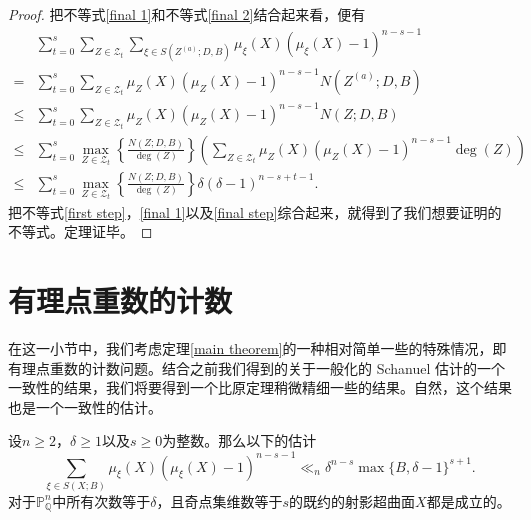 \begin{proof}
把不等式\eqref{final 1}和不等式\eqref{final 2}结合起来看，便有
\begin{align} \label{final step}
& \sum_{t=0}^{s} \sum_{Z\in\mathcal{Z}_t} \sum_{\xi\in S(Z^{(a)};D,B)} \mu_\xi(X)(\mu_\xi(X)-1)^{n-s-1} \nonumber \\
= & \sum_{t=0}^{s} \sum_{Z\in\mathcal{Z}_t} \mu_Z(X)(\mu_Z(X)-1)^{n-s-1}N(Z^{(a)};D,B) \\
\leqslant & \sum_{t=0}^{s} \sum_{Z\in\mathcal{Z}_t} \mu_Z(X)(\mu_Z(X)-1)^{n-s-1}N(Z;D,B) \\
\leqslant & \sum_{t=0}^{s} \max_{Z\in\mathcal{Z}_t} \left\{\frac{N(Z;D,B)}{\deg(Z)}\right\} \left(\sum_{Z\in\mathcal{Z}_t} \mu_Z(X)(\mu_Z(X)-1)^{n-s-1}\deg(Z)\right) \\
\leqslant & \sum_{t=0}^s \max_{Z\in\mathcal{Z}_t} \left\{\frac{N(Z;D,B)}{\deg(Z)}\right\} \delta(\delta-1)^{n-s+t-1}. 
\end{align}
把不等式\eqref{first step}，\eqref{final 1}以及\eqref{final step}综合起来，就得到了我们想要证明的不等式。定理证毕。
\end{proof}

\section{有理点重数的计数}
在这一小节中，我们考虑定理\ref{main theorem}的一种相对简单一些的特殊情况，即有理点重数的计数问题。结合之前我们得到的关于一般化的 Schanuel 估计的一个一致性的结果，我们将要得到一个比原定理稍微精细一些的结果。自然，这个结果也是一个一致性的估计。

\begin{corollary} \label{main corollary}
设$n \geqslant 2$，$\delta \geqslant 1$以及$s \geqslant 0$为整数。那么以下的估计
\begin{equation} \label{estimate in main corollary}
\sum_{\xi\in S(X;B)} \mu_\xi(X)(\mu_\xi(X)-1)^{n-s-1} \ll_{n} \delta^{n-s}\max\{B,\delta-1\}^{s+1}.
\end{equation}
对于$\mathbb{P}^n_{\mathbb{Q}}$中所有次数等于$\delta$，且奇点集维数等于$s$的既约的射影超曲面$X$都是成立的。
\end{corollary}

